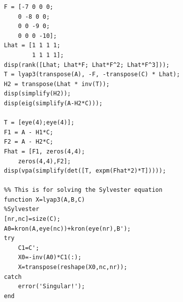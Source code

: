 \documentclass{article}
\begin{document}
\begin{lstlisting}
F = [-7 0 0 0; 
    0 -8 0 0;
    0 0 -9 0;
    0 0 0 -10];
Lhat = [1 1 1 1;
        1 1 1 1];
disp(rank([Lhat; Lhat*F; Lhat*F^2; Lhat*F^3]));
T = lyap3(transpose(A), -F, -transpose(C) * Lhat);
H2 = transpose(Lhat * inv(T));
disp(simplify(H2));
disp(eig(simplify(A-H2*C)));

T = [eye(4);eye(4)];
F1 = A - H1*C;
F2 = A - H2*C;
Fhat = [F1, zeros(4,4);
    zeros(4,4),F2];
disp(vpa(simplify(det([T, expm(Fhat*2)*T]))));

%% This is for solving the Sylvester equation
function X=lyap3(A,B,C)
%Sylvester
[nr,nc]=size(C);
A0=kron(A,eye(nc))+kron(eye(nr),B');
try
    C1=C';
    X0=-inv(A0)*C1(:);
    X=transpose(reshape(X0,nc,nr));
catch
    error('Singular!');
end

\end{lstlisting}
\end{document}
